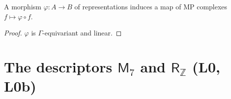 \begin{lemma}\label{lem:mp-cochains-natural}
  \leanok
  A morphism $\varphi\colon A\to B$ of representations induces a map of MP complexes $f\mapsto\varphi\circ f$.
\end{lemma}
\begin{proof}
  \leanok
  $\varphi$ is $\Gamma$-equivariant and linear.
\end{proof}

\section{The descriptors $\mathsf M_7$ and $\mathsf R_{\mathbb Z}$ (L0, L0b)}

